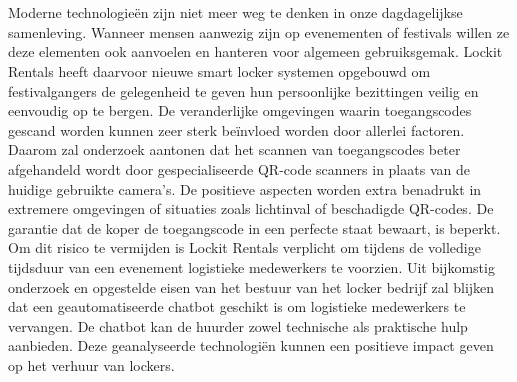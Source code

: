 
%
%
%
%
%

%





\chapter*{}

Moderne technologieën zijn niet meer weg te denken in onze dagdagelijkse samenleving. Wanneer mensen aanwezig zijn op evenementen of festivals willen ze deze elementen ook aanvoelen en hanteren voor algemeen gebruiksgemak. Lockit Rentals heeft daarvoor nieuwe smart locker systemen opgebouwd om festivalgangers de gelegenheid te geven hun persoonlijke bezittingen veilig en eenvoudig op te bergen. De veranderlijke omgevingen waarin toegangscodes gescand worden kunnen zeer sterk beïnvloed worden door allerlei factoren. Daarom zal onderzoek aantonen dat het scannen van toegangscodes beter afgehandeld wordt door gespecialiseerde QR-code scanners in plaats van de huidige gebruikte camera’s. De positieve aspecten worden extra benadrukt in extremere omgevingen of situaties zoals lichtinval of beschadigde QR-codes. De garantie dat de koper de toegangscode in een perfecte staat bewaart, is beperkt. Om dit risico te vermijden is Lockit Rentals verplicht om tijdens de volledige tijdsduur van een evenement logistieke medewerkers te voorzien. Uit bijkomstig onderzoek en opgestelde eisen van het bestuur van het locker bedrijf zal blijken dat een geautomatiseerde chatbot geschikt is om logistieke medewerkers te vervangen. De chatbot kan de huurder zowel technische als praktische hulp aanbieden. Deze geanalyseerde technologiën kunnen een positieve impact geven op het verhuur van lockers.
